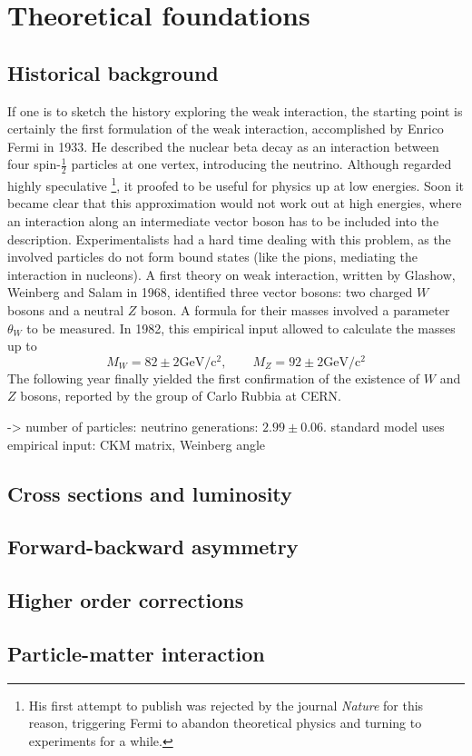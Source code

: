 \section{Theoretical foundations}
\subsection{Historical background}
If one is to sketch the history exploring the weak interaction, 
the starting point is certainly the first formulation of the 
weak interaction, accomplished by Enrico Fermi in 1933. 
He described the nuclear beta decay as an interaction 
between four spin-$\frac{1}{2}$ particles at one vertex, 
introducing the neutrino. Although regarded highly speculative%
\footnote{His first attempt to publish was rejected by the journal
\emph{Nature} for this reason, triggering Fermi to abandon 
theoretical physics and turning to experiments for a while.}, 
it proofed to be useful for physics up at low energies. 
Soon it became clear that this approximation would not work out 
at high energies, where an interaction along an intermediate 
vector boson has to be included into the description. 
Experimentalists had a hard time dealing with this problem, 
as the involved particles do not form bound states (like the 
pions, mediating the interaction in nucleons). A first theory
on weak interaction, written by Glashow, Weinberg and Salam 
in 1968, identified three vector bosons: two charged $W$ bosons 
and a neutral $Z$ boson. A formula for their masses involved a 
parameter $\theta_W$ to be measured. In 1982, this empirical 
input allowed to calculate the masses up to
\begin{equation}
    M_W = 82 \pm 2 \mathrm{GeV / c^2},\qquad 
    M_Z = 92 \pm 2 \mathrm{GeV / c^2}
\end{equation}
The following year finally yielded the first confirmation 
of the existence of $W$ and $Z$ bosons, reported by the group 
of Carlo Rubbia at CERN. 


-> number of particles: neutrino generations: $2.99 \pm 0.06$. 
standard model uses empirical input: CKM matrix, Weinberg angle


\subsection{Cross sections and luminosity}
\subsection{Forward-backward asymmetry}
\subsection{Higher order corrections}
\subsection{Particle-matter interaction}

